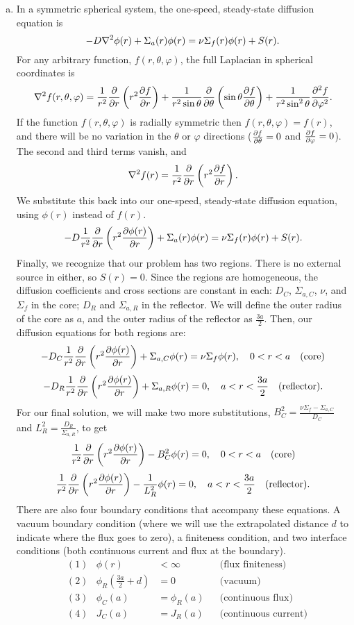 \documentclass{report}
\begin{document}
\begin{enumerate}[a)]

\item

 In a symmetric spherical system, the one-speed, steady-state diffusion equation is
$$ -D \nabla^2 \phi(r) + \Sigma_a (r) \phi(r) = \nu \Sigma_f(r) \phi(r) + S(r) .$$
For any arbitrary function, $f(r,\theta,\varphi)$, the full Laplacian in spherical coordinates is
$$ \nabla^2 f(r,\theta,\varphi) = \frac{1}{r^2}\frac{\partial}{\partial r}\left(r^2 \frac{\partial f}{\partial r}\right) +  \frac{1}{r^2 \sin\theta} \frac{\partial}{\partial \theta}\left(\sin\theta \frac{\partial f}{\partial \theta}\right) + \frac{1}{r^2 \sin^2 \theta} \frac{\partial^2 f}{\partial \varphi^2} .$$
If the function $f(r,\theta,\varphi)$ is radially symmetric then $f(r,\theta,\varphi) = f(r)$, and there will be no variation in the $\theta$ or $\varphi$ directions ($\frac{\partial f}{\partial \theta} = 0$ and $\frac{\partial f}{\partial \varphi} = 0$).  The second and third terms vanish, and
$$ \nabla^2 f(r) = \frac{1}{r^2}\frac{\partial}{\partial r}\left(r^2 \frac{\partial f}{\partial r}\right) .$$
We substitute this back into our one-speed, steady-state diffusion equation, using $\phi(r)$ instead of $f(r)$.
$$ -D \frac{1}{r^2}\frac{\partial}{\partial r}\left(r^2 \frac{\partial \phi(r)}{\partial r}\right) + \Sigma_a (r) \phi(r) = \nu \Sigma_f(r) \phi(r) + S(r) .$$
Finally, we recognize that our problem has two regions. There is no external source in either, so $S(r) = 0$. Since the regions are homogeneous, the diffusion coefficients and cross sections are constant in each: $D_C$, $\Sigma_{a,C}$, $\nu$, and $\Sigma_f$ in the core; $D_R$ and $\Sigma_{a,R}$ in the reflector. We will define the outer radius of the core as $a$, and the outer radius of the reflector as $\frac{3a}{2}$. Then, our diffusion equations for both regions are:
$$ -D_C \frac{1}{r^2}\frac{\partial}{\partial r}\left(r^2 \frac{\partial \phi(r)}{\partial r}\right) + \Sigma_{a,C} \phi(r) = \nu \Sigma_f \phi(r), \quad 0 < r < a \quad\text{(core)} $$
$$ -D_R \frac{1}{r^2}\frac{\partial}{\partial r}\left(r^2 \frac{\partial \phi(r)}{\partial r}\right) + \Sigma_{a,R}\phi(r) = 0, \quad a < r < \frac{3a}{2} \quad\text{(reflector)}.$$
For our final solution, we will make two more substitutions, $B_C^2 = \frac{\nu\Sigma_f - \Sigma_{a,C}}{D_C}$ and $L_R^2 = \frac{D_R}{\Sigma_{a,R}}$, to get
$$ \frac{1}{r^2}\frac{\partial}{\partial r}\left(r^2 \frac{\partial \phi(r)}{\partial r}\right) - B_C^2 \phi(r) = 0, \quad 0 < r < a \quad\text{(core)} $$
$$ \frac{1}{r^2}\frac{\partial}{\partial r}\left(r^2 \frac{\partial \phi(r)}{\partial r}\right) - \frac{1}{L_R^2}\phi(r) = 0, \quad a < r < \frac{3a}{2} \quad\text{(reflector)} .$$
There are also four boundary conditions that accompany these equations. A vacuum boundary condition (where we will use the extrapolated distance $d$ to indicate where the flux goes to zero), a finiteness condition, and two interface conditions (both continuous current and flux at the boundary). 
\begin{align*}
&(1)& \phi(r) &< \infty  						& &\text{(flux finiteness)} \\
&(2)& \phi_R\left(\frac{3a}{2} + d\right) &= 0 	& &\text{(vacuum)} \\
&(3)& \phi_C(a) &= \phi_R(a)					& &\text{(continuous flux)} \\
&(4)& J_C(a) &= J_R(a)							& &\text{(continuous current)}
\end{align*} 


\end{enumerate}
\end{document}
